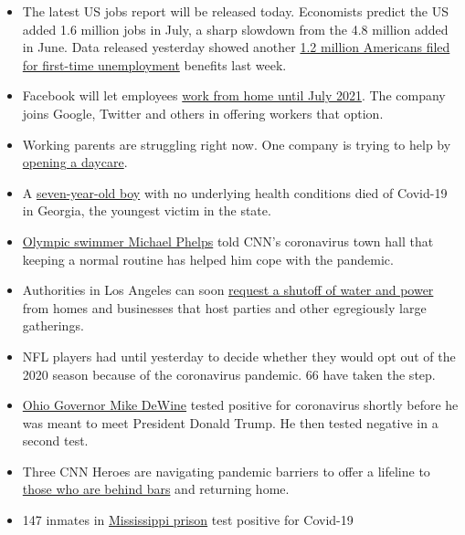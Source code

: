 \begin{itemize}
\tightlist
\item
  The latest US jobs report will be released today. Economists predict
  the US added 1.6 million jobs in July, a sharp slowdown from the 4.8
  million added in June. Data released yesterday showed another
  \href{https://cnn.com/2020/08/06/economy/unemployment-benefits-coronavirus/index.html}{1.2
  million Americans filed for first-time unemployment} benefits last
  week.
\item
  Facebook will let employees
  \href{https://cnn.com/2020/08/06/tech/facebook-work-from-home/index.html}{work
  from home until July 2021}. The company joins Google, Twitter and
  others in offering workers that option.
\item
  Working parents are struggling right now. One company is trying to
  help by
  \href{https://cnn.com/2020/08/06/success/childcare-coronavirus/index.html}{opening
  a daycare}.
\item
  A
  \href{https://cnn.com/2020/08/06/us/georgia-boy-covid-19-death/index.html}{seven-year-old
  boy} with no underlying health conditions died of Covid-19 in Georgia,
  the youngest victim in the state.
\item
  \href{https://cnn.com/2020/08/06/app-news-section/full-coronavirus-town-hall-august-6-2020/index.html}{Olympic
  swimmer Michael Phelps} told CNN's coronavirus town hall that keeping
  a normal routine has helped him cope with the pandemic.
\item
  Authorities in Los Angeles can soon
  \href{https://cnn.com/2020/08/06/us/los-angeles-shuts-off-power-parties-coronavirus-trnd/index.html}{request
  a shutoff of water and power} from homes and businesses that host
  parties and other egregiously large gatherings.
\item
  NFL players had until yesterday to decide whether they would opt out
  of the 2020 season because of the coronavirus pandemic. 66 have taken
  the step.
\item
  \href{https://cnn.com/2020/08/06/politics/mike-dewine-coronavirus/index.html}{Ohio
  Governor Mike DeWine} tested positive for coronavirus shortly before
  he was meant to meet President Donald Trump. He then tested negative
  in a second test.
\item
  Three CNN Heroes are navigating pandemic barriers to offer a lifeline
  to
  \href{https://cnn.com/2020/08/06/us/coronavirus-incarceration-obstacles-employment-food-donations-cnnheroes/index.html}{those
  who are behind bars} and returning home.
\item
  147 inmates in
  \href{https://cnn.com/2020/08/06/us/vermont-prisoners-trnd/index.html}{Mississippi
  prison} test positive for Covid-19
\end{itemize}

